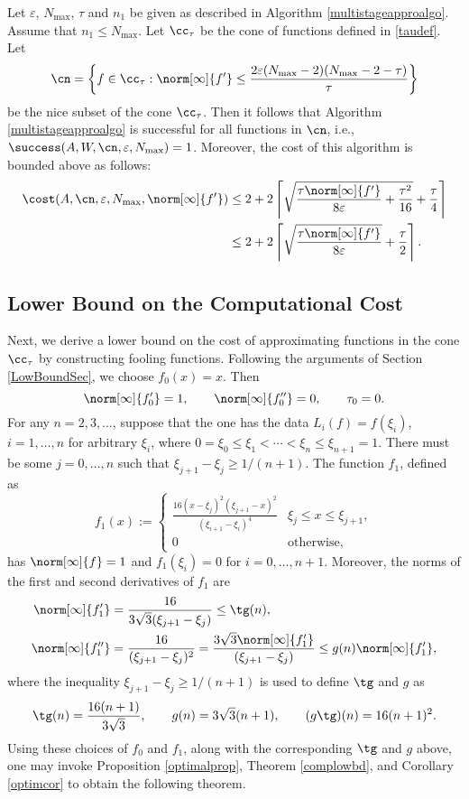 \begin{theorem}   Let  $\varepsilon$, $N_{\max}$, $\tau$ and $n_1$ be given as described in Algorithm \ref{multistageapproalgo}.  Assume that $n_1 \le N_{\max}$.  Let $\cc_\tau$ be the cone of functions defined in \eqref{taudef}.  Let
$$
\cn
= \left \{ f \in \cc_\tau : \norm[\infty]{f'} \le \frac{2\varepsilon (N_{\max}-2)(N_{\max}-2 -\tau)}{\tau} \right\}
$$
be the nice subset of the cone $\cc_\tau$.  Then it follows that Algorithm \ref{multistageapproalgo} is successful for all functions in $\cn$,  i.e.,  $\success(A,W,\cn,\varepsilon,N_{\max}) = 1$.  Moreover, the cost of this algorithm is bounded above as follows:
\begin{align*}
\cost(A,\cn,\varepsilon,N_{\max},\norm[\infty]{f'})
&\le 2+2 \left \lceil \sqrt{\frac{\tau \norm[\infty]{f'}}{8\varepsilon} + \frac{\tau^2 }{16}} + \frac{\tau}{4} \right\rceil \\
&\le 2+2 \left \lceil\sqrt{\frac{\tau \norm[\infty]{f'}}{8\varepsilon}} + \frac{\tau}{2} \right \rceil.
\end{align*}
\end{theorem}


\subsection{Lower Bound on the Computational Cost}
Next, we derive a lower bound on the cost of approximating functions in the cone $\cc_{\tau}$ by constructing fooling functions. Following the arguments of Section \ref{LowBoundSec}, we choose  $f_0(x)=x.$ Then
\[
\norm[\infty]{f'_0}=1, \qquad \norm[\infty]{f''_0}=0, \qquad \tau_0=0.
\]
For any $n =2, 3, \ldots$, suppose that the one has the data $L_i(f)=f(\xi_i)$, $i=1, \ldots, n$ for arbitrary $\xi_i$, where $0=\xi_0 \le \xi_1 < \cdots < \xi_n \le \xi_{n+1} = 1$.  There must be some $j=0, \ldots, n$ such that $\xi_{j+1} - \xi_j \ge 1/(n+1)$.  The function $f_{1}$, defined as
$$
f_{1}(x):=\begin{cases} \displaystyle
\frac{16(x-\xi_{j})^{2}(\xi_{j+1}-x)^{2}}{(\xi_{i+1}-\xi_{i})^4} & \xi_{j} \le x \leq \xi_{j+1},\\
0 & \text{otherwise},
\end{cases}
$$
has $\norm[\infty]{f}=1$ and $f_1(\xi_i)=0$ for $i=0, \ldots, n+1$.  Moreover, the norms of the first and second derivatives of $f_1$ are
\begin{align*}
\norm[\infty]{f'_1}&=\frac{16}{3\sqrt{3}(\xi_{j+1}-\xi_{j})}\leq \tg(n),\\
\norm[\infty]{f''_1}&=\frac{16}{(\xi_{j+1}-\xi_{j})^2}
=\frac{3\sqrt{3}\norm[\infty]{f'_1}}{(\xi_{j+1}-\xi_{j})}
 \leq g(n) \norm[\infty]{f'_1},
\end{align*}
where the inequality $\xi_{j+1} - \xi_j \ge 1/(n+1)$ is used to define $\tg$ and $g$ as
\[
\tg(n) = \frac{16(n+1)}{3\sqrt{3}}, \qquad g(n) = 3\sqrt{3}(n+1), \qquad (g\tg)(n) = 16(n+1)^2.
\]
Using these choices of $f_0$ and $f_1$, along with the corresponding $\tg$ and $g$ above, one may invoke Proposition \ref{optimalprop}, Theorem \ref{complowbd}, and Corollary \ref{optimcor} to obtain the following theorem.

